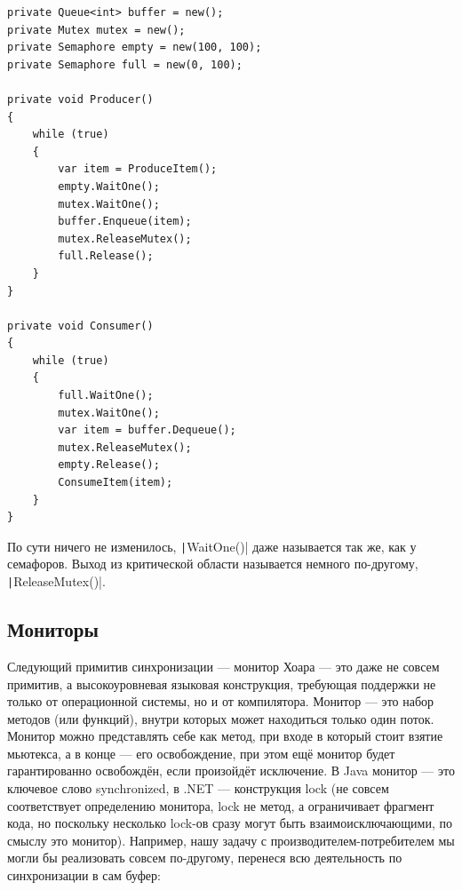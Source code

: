 \documentclass{../../text-style}
\begin{document}
\begin{verbatim}
private Queue<int> buffer = new();
private Mutex mutex = new();
private Semaphore empty = new(100, 100);
private Semaphore full = new(0, 100);

private void Producer()
{
    while (true)
    {
        var item = ProduceItem();
        empty.WaitOne();
        mutex.WaitOne();
        buffer.Enqueue(item);
        mutex.ReleaseMutex();
        full.Release();
    }
}

private void Consumer()
{
    while (true)
    {
        full.WaitOne();
        mutex.WaitOne();
        var item = buffer.Dequeue();
        mutex.ReleaseMutex();
        empty.Release();
        ConsumeItem(item);
    }
}
\end{verbatim}

По сути ничего не изменилось, \texttt|WaitOne()| даже называется так же, как у семафоров. Выход из критической области называется немного по-другому, \texttt|ReleaseMutex()|.

\subsection{Мониторы}

Следующий примитив синхронизации --- монитор Хоара --- это даже не совсем примитив, а высокоуровневая языковая конструкция, требующая поддержки не только от операционной системы, но и от компилятора. Монитор --- это набор методов (или функций), внутри которых может находиться только один поток. Монитор можно представлять себе как метод, при входе в который стоит взятие мьютекса, а в конце --- его освобождение, при этом ещё монитор будет гарантированно освобождён, если произойдёт исключение. В Java монитор --- это ключевое слово synchronized, в .NET --- конструкция lock (не совсем соответствует определению монитора, lock не метод, а ограничивает фрагмент кода, но поскольку несколько lock-ов сразу могут быть взаимоисключающими, по смыслу это монитор). Например, нашу задачу с производителем-потребителем мы могли бы реализовать совсем по-другому, перенеся всю деятельность по синхронизации в сам буфер:
\end{document}
